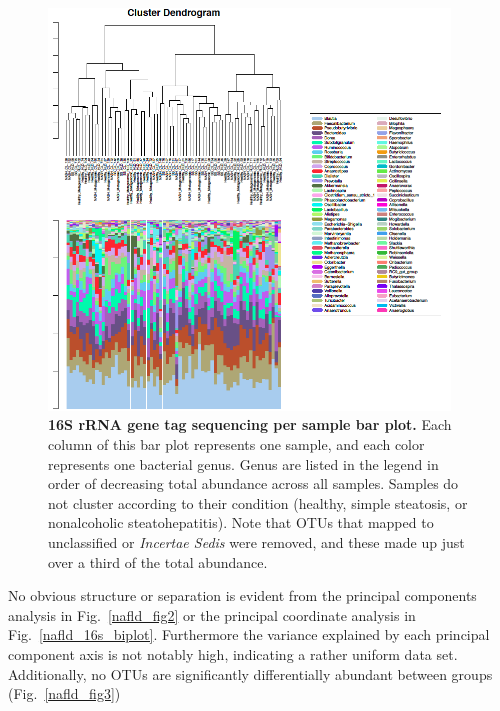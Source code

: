 \begin{figure}[h]
\begin{center}
\includegraphics[width=0.95\textwidth]{16s_genus_barplot.png}
\caption{\textbf{16S rRNA gene tag sequencing per sample bar plot.} Each column of this bar plot represents one sample, and each color represents one bacterial genus. Genus are listed in the legend in order of decreasing total abundance across all samples. Samples do not cluster according to their condition (healthy, simple steatosis, or nonalcoholic steatohepatitis). Note that OTUs that mapped to unclassified or \textit{Incertae Sedis} were removed, and these made up just over a third of the total abundance.}
\end{center}
\label{nafld_16s_barplot}
\end{figure}

No obvious structure or separation is evident from the principal components analysis in Fig.~\ref{nafld_fig2} or the principal coordinate analysis in Fig.~\ref{nafld_16s_biplot}. Furthermore the variance explained by each principal component axis is not notably high, indicating a rather uniform data set. Additionally, no OTUs are significantly differentially abundant between groups (Fig.~\ref{nafld_fig3})

